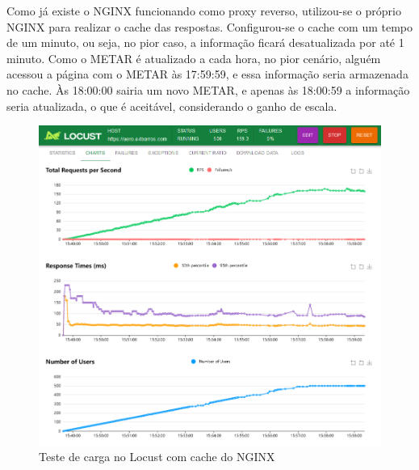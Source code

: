 Como já existe o NGINX funcionando como proxy reverso, utilizou-se o próprio NGINX 
para realizar o cache das respostas. Configurou-se o cache com um tempo de um minuto, 
ou seja, no pior caso, a informação ficará desatualizada por até 1 minuto. Como 
o METAR é atualizado a cada hora, no pior cenário, alguém acessou a página com 
o METAR às 17:59:59, e essa informação seria armazenada no cache. Às 18:00:00 
sairia um novo METAR, e apenas às 18:00:59 a informação seria atualizada, o que
 é aceitável, considerando o ganho de escala.

\begin{figure}[ht]
    \begin{center}
    \includegraphics[width=400pt]{img/locust-cache.png}
    \caption{Teste de carga no Locust com cache do NGINX}
    \label{fig:locust-cache}
    \end{center}
\end{figure}